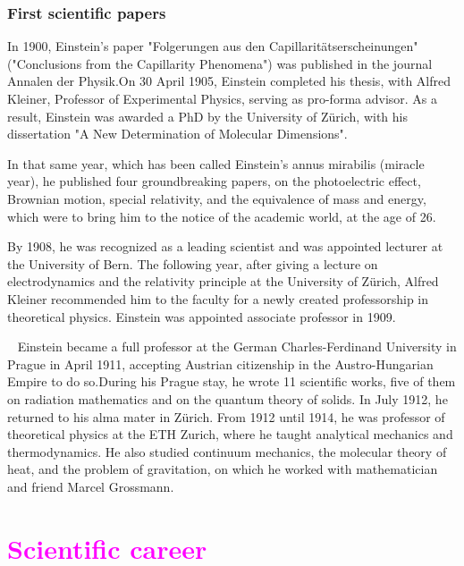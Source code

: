 \documentclass{article}
\begin{document}
\subsubsection{First scientific papers}
In 1900, Einstein's paper "Folgerungen aus den Capillaritätserscheinungen" ("Conclusions from the Capillarity Phenomena") was published in the journal Annalen der Physik.On 30 April 1905, Einstein completed his thesis, with Alfred Kleiner, Professor of Experimental Physics, serving as pro-forma advisor. As a result, Einstein was awarded a PhD by the University of Zürich, with his dissertation "A New Determination of Molecular Dimensions".

In that same year, which has been called Einstein's annus mirabilis (miracle year), he published four groundbreaking papers, on the photoelectric effect, Brownian motion, special relativity, and the equivalence of mass and energy, which were to bring him to the notice of the academic world, at the age of 26.

\begin{flushleft}
By 1908, he was recognized as a leading scientist and was appointed lecturer at the University of Bern. The following year, after giving a lecture on electrodynamics and the relativity principle at the University of Zürich, Alfred Kleiner recommended him to the faculty for a newly created professorship in theoretical physics. Einstein was appointed associate professor in 1909.

~\newline
Einstein became a full professor at the German Charles-Ferdinand University in Prague in April 1911, accepting Austrian citizenship in the Austro-Hungarian Empire to do so.During his Prague stay, he wrote 11 scientific works, five of them on radiation mathematics and on the quantum theory of solids. In July 1912, he returned to his alma mater in Zürich. From 1912 until 1914, he was professor of theoretical physics at the ETH Zurich, where he taught analytical mechanics and thermodynamics. He also studied continuum mechanics, the molecular theory of heat, and the problem of gravitation, on which he worked with mathematician and friend Marcel Grossmann.
\end{flushleft}




\section{\textcolor{magenta}{Scientific career}}
\end{document}
